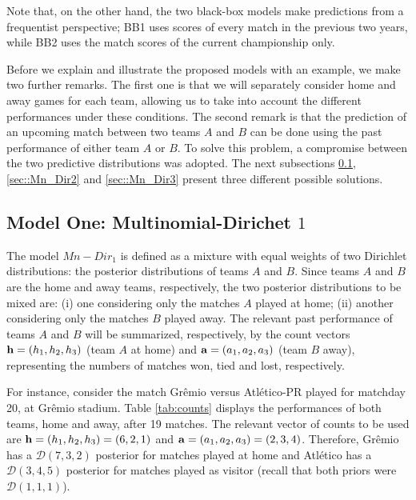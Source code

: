 \documentclass[journal,article,accept,moreauthors,pdftex,12pt,a4paper]{mdpi}
\begin{document}
	Note that, on the other hand, the two
	black-box models make predictions from a frequentist perspective; BB1 uses scores of every match
	in the previous two years, while BB2 uses the match scores of the current championship only.
	
	Before we explain and illustrate the proposed models with an example, we make two further remarks.
	The first one is that we will separately consider home and away games for each team, allowing us to take into account the different performances under these conditions.
	The second remark is that the prediction of an upcoming match between two teams $A$ and $B$ can be done using
	the past performance of either team $A$ or $B$.
	To solve this problem, a compromise between the two predictive distributions was adopted.
	The next subsections \ref{sec::Mn_Dir1}, \ref{sec::Mn_Dir2} and \ref{sec::Mn_Dir3} present three different possible solutions.
	
	\subsection{Model One: Multinomial-Dirichet $1$}
	\label{sec::Mn_Dir1}
	
	The model $Mn-Dir_1$ is defined as a mixture with equal weights of two Dirichlet distributions: the posterior distributions of teams $A$ and $B$.
	Since teams $A$ and $B$ are the home and away teams, respectively, the two posterior distributions to be mixed are: (i) one considering only the matches $A$ played at home; (ii) another considering only the matches $B$ played away.
	The relevant past performance of teams $A$ and $B$ will be summarized, respectively, by the count vectors ${\bf h} = (h_1, h_2, h_3)$ (team $A$ at home) and ${\bf a} = (a_1, a_2, a_3)$ (team $B$ away), representing the numbers of matches won, tied and lost, respectively.
	
	For instance, consider the match Gr\^emio versus Atl\'etico-PR played for matchday 20, at Gr\^emio stadium. Table \ref{tab:counts} displays the performances of both teams, home and away, after 19
	matches. The relevant vector of counts to be used are ${\bf h}=(h_1,h_2,h_3)=(6,2,1)$ and ${\bf a}=(a_1,a_2,a_3)=(2,3,4)$.
	Therefore, Gr\^emio has a $\mathcal{D}(7,3,2)$ posterior for matches played at home and Atl\'etico has a $\mathcal{D}(3,4,5)$ posterior for matches played as visitor (recall that both priors were
	$\mathcal{D}(1,1,1)$).
	
\end{document}
